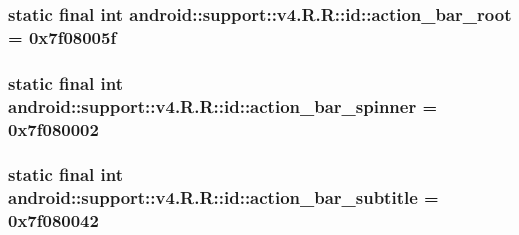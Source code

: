 \hypertarget{classandroid_1_1support_1_1v4_1_1_r_1_1id_cf9f148044b71b6af49257efe30d7909}{
\subsubsection[{action\_\-bar\_\-root}]{\setlength{\rightskip}{0pt plus 5cm}static final int android::support::v4.R.R::id::action\_\-bar\_\-root = 0x7f08005f}}
\label{classandroid_1_1support_1_1v4_1_1_r_1_1id_cf9f148044b71b6af49257efe30d7909}


\hypertarget{classandroid_1_1support_1_1v4_1_1_r_1_1id_7fad0fc1e933a1a6ae9217cfe2646df7}{
\subsubsection[{action\_\-bar\_\-spinner}]{\setlength{\rightskip}{0pt plus 5cm}static final int android::support::v4.R.R::id::action\_\-bar\_\-spinner = 0x7f080002}}
\label{classandroid_1_1support_1_1v4_1_1_r_1_1id_7fad0fc1e933a1a6ae9217cfe2646df7}


\hypertarget{classandroid_1_1support_1_1v4_1_1_r_1_1id_a72de7fa29cd46eb37a68befa8b6f081}{
\subsubsection[{action\_\-bar\_\-subtitle}]{\setlength{\rightskip}{0pt plus 5cm}static final int android::support::v4.R.R::id::action\_\-bar\_\-subtitle = 0x7f080042}}
\label{classandroid_1_1support_1_1v4_1_1_r_1_1id_a72de7fa29cd46eb37a68befa8b6f081}



